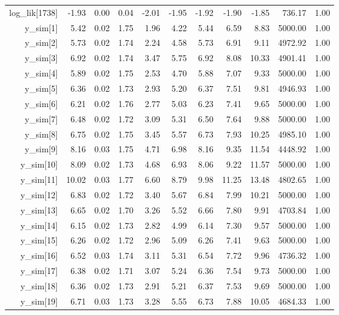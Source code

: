 \begin{table}[ht]
\begin{tabular}{rrrrrrrrrrr}
  log\_lik[1738] & -1.93 & 0.00 & 0.04 & -2.01 & -1.95 & -1.92 & -1.90 & -1.85 & 736.17 & 1.00 \\ 
  y\_sim[1] & 5.42 & 0.02 & 1.75 & 1.96 & 4.22 & 5.44 & 6.59 & 8.83 & 5000.00 & 1.00 \\ 
  y\_sim[2] & 5.73 & 0.02 & 1.74 & 2.24 & 4.58 & 5.73 & 6.91 & 9.11 & 4972.92 & 1.00 \\ 
  y\_sim[3] & 6.92 & 0.02 & 1.74 & 3.47 & 5.75 & 6.92 & 8.08 & 10.33 & 4901.41 & 1.00 \\ 
  y\_sim[4] & 5.89 & 0.02 & 1.75 & 2.53 & 4.70 & 5.88 & 7.07 & 9.33 & 5000.00 & 1.00 \\ 
  y\_sim[5] & 6.36 & 0.02 & 1.73 & 2.93 & 5.20 & 6.37 & 7.51 & 9.81 & 4946.93 & 1.00 \\ 
  y\_sim[6] & 6.21 & 0.02 & 1.76 & 2.77 & 5.03 & 6.23 & 7.41 & 9.65 & 5000.00 & 1.00 \\ 
  y\_sim[7] & 6.48 & 0.02 & 1.72 & 3.09 & 5.31 & 6.50 & 7.64 & 9.88 & 5000.00 & 1.00 \\ 
  y\_sim[8] & 6.75 & 0.02 & 1.75 & 3.45 & 5.57 & 6.73 & 7.93 & 10.25 & 4985.10 & 1.00 \\ 
  y\_sim[9] & 8.16 & 0.03 & 1.75 & 4.71 & 6.98 & 8.16 & 9.35 & 11.54 & 4448.92 & 1.00 \\ 
  y\_sim[10] & 8.09 & 0.02 & 1.73 & 4.68 & 6.93 & 8.06 & 9.22 & 11.57 & 5000.00 & 1.00 \\ 
  y\_sim[11] & 10.02 & 0.03 & 1.77 & 6.60 & 8.79 & 9.98 & 11.25 & 13.48 & 4802.65 & 1.00 \\ 
  y\_sim[12] & 6.83 & 0.02 & 1.72 & 3.40 & 5.67 & 6.84 & 7.99 & 10.21 & 5000.00 & 1.00 \\ 
  y\_sim[13] & 6.65 & 0.02 & 1.70 & 3.26 & 5.52 & 6.66 & 7.80 & 9.91 & 4703.84 & 1.00 \\ 
  y\_sim[14] & 6.15 & 0.02 & 1.73 & 2.82 & 4.99 & 6.14 & 7.30 & 9.57 & 5000.00 & 1.00 \\ 
  y\_sim[15] & 6.26 & 0.02 & 1.72 & 2.96 & 5.09 & 6.26 & 7.41 & 9.63 & 5000.00 & 1.00 \\ 
  y\_sim[16] & 6.52 & 0.03 & 1.74 & 3.11 & 5.31 & 6.54 & 7.72 & 9.96 & 4736.32 & 1.00 \\ 
  y\_sim[17] & 6.38 & 0.02 & 1.71 & 3.07 & 5.24 & 6.36 & 7.54 & 9.73 & 5000.00 & 1.00 \\ 
  y\_sim[18] & 6.36 & 0.02 & 1.73 & 2.91 & 5.21 & 6.37 & 7.53 & 9.69 & 5000.00 & 1.00 \\ 
  y\_sim[19] & 6.71 & 0.03 & 1.73 & 3.28 & 5.55 & 6.73 & 7.88 & 10.05 & 4684.33 & 1.00 \\ 

\end{tabular}
\end{table}
